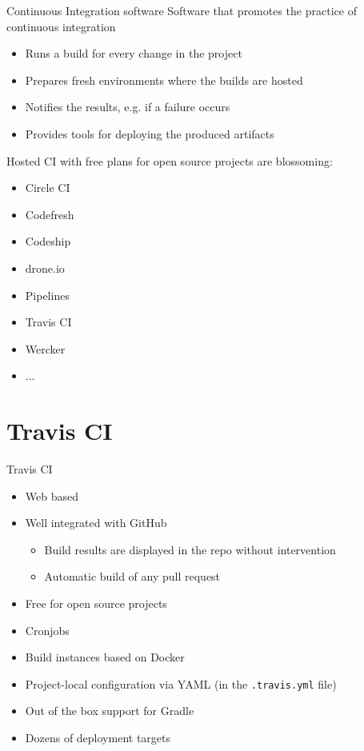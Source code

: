 \documentclass[presentation]{beamer}
\begin{document}
\begin{frame}[fragile]{Continuous Integration software}
	Software that promotes the practice of continuous integration
	\begin{itemize}
		\item Runs a build for every change in the project
		\item Prepares fresh environments where the builds are hosted
		\item Notifies the results, e.g. if a failure occurs
		\item Provides tools for deploying the produced artifacts
	\end{itemize}
	Hosted CI with free plans for open source projects are blossoming:
	\scriptsize
	\begin{itemize}
		\item Circle CI
		\item Codefresh
		\item Codeship
		\item drone.io
		\item Pipelines
		\item Travis CI
		\item Wercker
		\item ...
	\end{itemize}
\end{frame}

\section{Travis CI}

\begin{frame}[fragile]{Travis CI}
	\begin{itemize}
		\item Web based
		\item Well integrated with GitHub
		\begin{itemize}
			\item Build results are displayed in the repo without intervention
			\item Automatic build of any pull request
		\end{itemize}
		\item Free for open source projects
		\item Cronjobs
		\item Build instances based on Docker
		\item Project-local configuration via YAML (in the \texttt{.travis.yml} file)
		\item Out of the box support for Gradle
		\item Dozens of deployment targets
	\end{itemize}
\end{frame}
\end{document}
